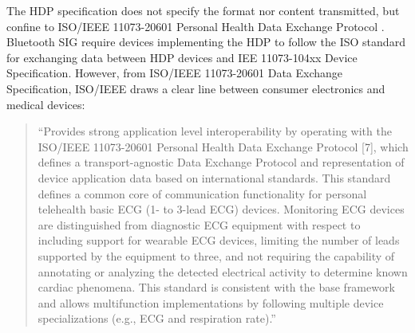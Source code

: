 The HDP specification does not specify the format nor content transmitted, but confine to ISO/IEEE 11073-20601 Personal Health Data Exchange Protocol \cite{newRef:18}. Bluetooth SIG require devices implementing the HDP to follow the ISO standard for exchanging data between HDP devices and IEE 11073-104xx Device Specification. However, from ISO/IEEE 11073-20601 Data Exchange Specification, ISO/IEEE draws a clear line between consumer electronics and medical devices: 

\begin{quote}

``Provides strong application level interoperability by operating with the ISO/IEEE 11073-20601 Personal Health Data Exchange Protocol [7], which defines a transport-agnostic Data Exchange Protocol and representation of device application data based on international standards. This standard defines a common core of communication functionality for personal telehealth basic ECG (1- to 3-lead ECG) devices. Monitoring ECG devices are distinguished from diagnostic ECG equipment with respect to including support for wearable ECG devices, limiting the number of leads supported by the equipment to three, and not requiring the capability of annotating or analyzing the detected electrical activity to determine known cardiac phenomena. This standard is consistent with the base framework and allows multifunction implementations by following multiple device specializations (e.g., ECG and respiration rate).'' \cite{newRef:18}

\end{quote}




